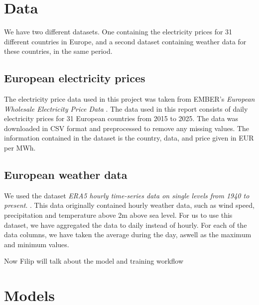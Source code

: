 \documentclass[12pt]{article}
\begin{document}
\section{Data}

We have two different datasets. One containing the electricity prices for 31 different countries in Europe, and a second dataset containing weather data for these countries, in the same period. 

\subsection{European electricity prices}

The electricity price data used in this project was taken from EMBER's \textit{European Wholesale Electricity Price Data} \citep{ember2025}.  The data used in this report consists of daily electricity prices for 31 European countries from 2015 to 2025. The data was downloaded in CSV format and preprocessed to remove any missing values. The information contained in the dataset is the country, data, and price given in EUR per MWh. 

\subsection{European weather data}
We used the dataset \textit{ERA5 hourly time-series data on single levels from 1940 to present}. \citep{hersbach2025era5}. This data originally contained hourly weather data, such as wind speed, precipitation and temperature above 2m above sea level. For us to use this dataset, we have aggregated the data to daily instead of hourly. For each of the data columns, we have taken the average during the day, aswell as the maximum and minimum values. 

Now Filip will talk about the model and training workflow


 \clearpage




\section{Models}
\end{document}
